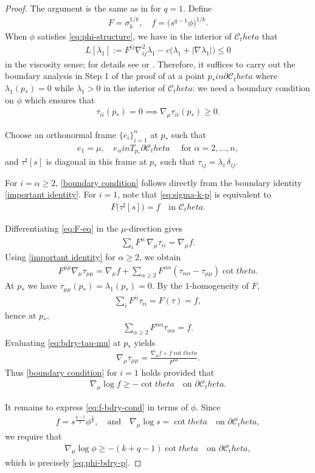 \documentclass[12pt]{amsart}
\def\theta{theta}%
\def\in{in }%
\numberwithin{equation}{section}
\newcommand{\8}{\infty}
\newcommand{\cC}{\mathcal{C}}
\newcommand{\abs}[1]{\lvert #1\rvert}
\newcommand{\eq}[1]{\begin{equation}\begin{alignedat}{2}#1\end{alignedat}\end{equation}}
\newcommand{\Cth}{\cC_\theta}
\begin{document}
\begin{proof}
The argument is the same as in \cite[Thm. 3.1]{HIS25} for $q=1$. Define
\eq{
  F = \sigma_k^{1/k},\quad
  f = \bigl(s^{q-1}\phi\bigr)^{1/k}.
}
When $\phi$ satisfies \eqref{eq:phi-structure}, we have in the interior of $\Cth$ that
\eq{
  L[\lambda_1]
  := F^{ij}\nabla^2_{ij}\lambda_1
     - c\bigl(\lambda_1 + \abs{\nabla \lambda_1}\bigr)
  \le 0
}
in the viscosity sense; for details see \cite[Thm. 2.2]{BIS23} or \cite[(3.20)]{CH25}. Therefore, it suffices to carry out the boundary analysis in Step 1 of the proof of \cite[Thm. 3.1]{HIS25} at a point $p_\ast\in\partial\Cth$ where $\lambda_1(p_\ast)=0$ while $\lambda_1>0$ in the interior of $\Cth$: we need a boundary condition on $\phi$ which ensures that
\eq{\label{boundary condition}
  \tau_{ii}(p_\ast)=0 \implies \nabla_\mu \tau_{ii}(p_\ast)\ge 0.
}

Choose an orthonormal frame $\{e_i\}_{i=1}^{n}$ at $p_\ast$ such that
\eq{
  e_1 = \mu,\quad e_\alpha\in T_{p_\ast}\partial \Cth\quad
  \text{ for } \alpha=2,\dots,n,
}
and $\tau^\sharp[s]$ is diagonal in this frame at $p_\ast$ such that $\tau_{ij}= \lambda_i\,\delta_{ij}$.

For $i=\alpha\ge2$, \eqref{boundary condition} follows directly from the boundary identity \eqref{important identity}. For $i=1$, note that \eqref{eq:sigma-k-p} is equivalent to
\eq{\label{eq:F-eq}
  F\bigl(\tau^\sharp[s]\bigr) = f
  \quad\text{in }\Cth.
}

Differentiating \eqref{eq:F-eq} in the $\mu$-direction gives
\eq{
  \sum_i F^{ii}\,\nabla_\mu\tau_{ii} = \nabla_\mu f.
}
Using \eqref{important identity} for $\alpha\ge2$, we obtain
\eq{ \label{eq:bdry-tau-mu}
  F^{\mu\mu}\nabla_\mu\tau_{\mu\mu}
  = \nabla_\mu f
     + \sum_{\alpha\ge2}F^{\alpha\alpha}
       (\tau_{\alpha\alpha}-\tau_{\mu\mu})\cot\theta.
}
At $p_\ast$ we have $\tau_{\mu\mu}(p_\ast)=\lambda_1(p_\ast)=0$. By the $1$-homogeneity of $F$,
\eq{
  \sum_i F^{ii}\tau_{ii} = F(\tau) = f,
}
hence at $p_\ast$,
\eq{
  \sum_{\alpha\ge2}F^{\alpha\alpha}\tau_{\alpha\alpha} = f.
}
Evaluating \eqref{eq:bdry-tau-mu} at $p_\ast$ yields
\eq{
\nabla_\mu\tau_{\mu\mu}
  = \frac{\nabla_\mu f + f\cot\theta}{F^{\mu\mu}}.
}
Thus \eqref{boundary condition} for $i=1$ holds provided that
\eq{\label{eq:f-bdry-cond}
\nabla_\mu\log f \ge -\cot\theta
  \quad\text{on }\partial \Cth.
}

It remains to express \eqref{eq:f-bdry-cond} in terms of $\phi$. Since
\eq{
  f = s^{\frac{q-1}{k}}\phi^\frac{1}{k},\quad \text{and}\quad
\nabla_\mu\log s = \cot\theta
  \quad\text{on }\partial \Cth,
}
we require that
\eq{
\nabla_\mu\log\phi \ge-(k+q-1)\cot\theta
  \quad\text{on }\partial \Cth,
}
which is precisely \eqref{eq:phi-bdry-p}.
\end{proof}
\end{document}
